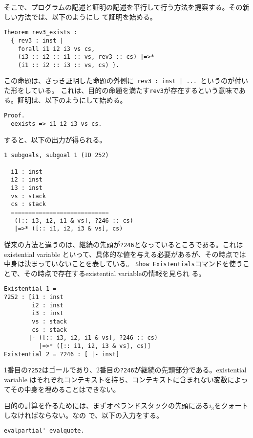 \documentclass[a4paper, 10pt, twocolumn, titlepage]{ujarticle}
\renewcommand{\{}{\symbol{"7B}}
\renewcommand{\}}{\symbol{"7D}}
\begin{document}
そこで、プログラムの記述と証明の記述を平行して行う方法を提案する。その新しい方法では、以下のようにし
て証明を始める。

\begin{lstlisting}[style=plain]
Theorem rev3_exists :
  { rev3 : inst |
    forall i1 i2 i3 vs cs,
    (i3 :: i2 :: i1 :: vs, rev3 :: cs) |=>*
    (i1 :: i2 :: i3 :: vs, cs) }.
\end{lstlisting}

この命題は、さっき証明した命題の外側に\texttt{\{ rev3 : inst | ... \}}というのが付いた形をしている。
これは、目的の命題を満たす\texttt{rev3}が存在するという意味である。証明は、以下のようにして始める。

\begin{lstlisting}[style=plain]
Proof.
  eexists => i1 i2 i3 vs cs.
\end{lstlisting}

すると、以下の出力が得られる。

\begin{lstlisting}[style=plain]
1 subgoals, subgoal 1 (ID 252)
  
  i1 : inst
  i2 : inst
  i3 : inst
  vs : stack
  cs : stack
  ============================
   ([:: i3, i2, i1 & vs], ?246 :: cs)
   |=>* ([:: i1, i2, i3 & vs], cs)
\end{lstlisting}

従来の方法と違うのは、継続の先頭が\texttt{?246}となっているところである。これはexistential variable
といって、具体的な値を与える必要があるが、その時点では中身は決まっていないことを表している。
\texttt{Show Existentials}コマンドを使うことで、その時点で存在するexistential variableの情報を見られ
る。

\begin{lstlisting}[style=plain]
Existential 1 =
?252 : [i1 : inst
        i2 : inst
        i3 : inst
        vs : stack
        cs : stack
       |- ([:: i3, i2, i1 & vs], ?246 :: cs)
          |=>* ([:: i1, i2, i3 & vs], cs)] 
Existential 2 = ?246 : [ |- inst] 
\end{lstlisting}

1番目の\texttt{?252}はゴールであり、2番目の\texttt{?246}が継続の先頭部分である。existential variable
はそれぞれコンテキストを持ち、コンテキストに含まれない変数によってその中身を埋めることはできない。

目的の計算を作るためには、まずオペランドスタックの先頭にある$i_3$をクォートしなければならない。なの
で、以下の入力をする。

\begin{lstlisting}[style=plain]
  evalpartial' evalquote.
\end{lstlisting}
\end{document}
